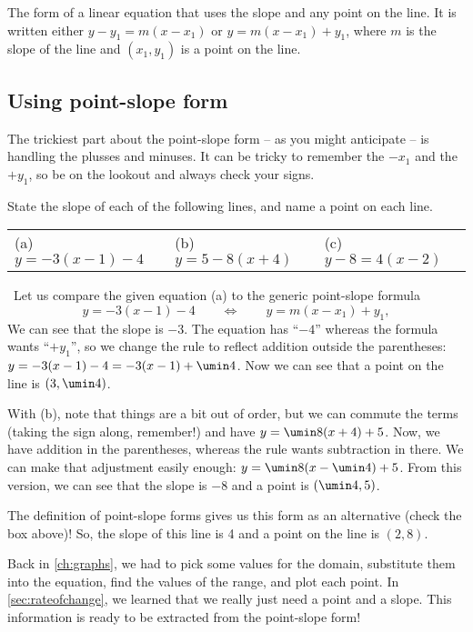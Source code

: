 \begin{boxdef}
The form of a linear equation that uses the slope and any point on the line. It is written either $y-y_1 = m(x-x_1)$ or $y=m(x-x_1)+y_1$, where $m$ is the slope of the line and $(x_1,y_1)$ is a point on the line.
\end{boxdef}

\subsection{Using point-slope form}

The trickiest part about the point-slope form -- as you might anticipate -- is handling the plusses and minuses. It can be tricky to remember the $-x_1$ and the $+y_1$, so be on the lookout and always check your signs.

\begin{boxex}
State the slope of each of the following lines, and name a point on each line.

\begin{center}
\begin{tabularx}{0.8\textwidth}{XXX}
(a)~ $y=-3(x-1)-4$
&
(b)~ $y=5-8(x+4)$
&
(c)~ $y-8=4(x-2)$
\end{tabularx}
\end{center}

\exsoln\ Let us compare the given equation (a) to the generic point-slope formula \[y=-3(x-1)-4 \qquad\iff\qquad y=m(x-x_1)+y_1,\] 
We can see that the slope is $-3$. The equation has ``$-4$'' whereas the formula wants ``$+y_1$'', so we change the rule to reflect addition outside the parentheses: $y=-3(x-1)-4 = -3(x-1)+\umin4$. Now we can see that a point on the line is $(3,\umin4)$.

With (b), note that things are a bit out of order, but we can commute the terms (taking the sign along, remember!) and have $y=\umin8(x+4)+5$. Now, we have addition in the parentheses, whereas the rule wants subtraction in there. We can make that adjustment easily enough: $y=\umin8(x-\umin4)+5$. From this version, we can see that the slope is $-8$ and a point is $(\umin4,5)$.

The definition of point-slope forms gives us this form as an alternative (check the box above)! So, the slope of this line is 4 and a point on the line is $(2,8)$.
\end{boxex}

Back in \cref{ch:graphs}, we had to pick some values for the domain, substitute them into the equation, find the values of the range, and plot each point. In \cref{sec:rateofchange}, we learned that we really just need a point and a slope. This information is ready to be extracted from the point-slope form!

